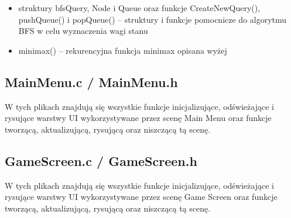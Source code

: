 \documentclass[11pt]{article}
\begin{document}
		\begin{itemize}
			\item struktury bfsQuery, Node i Queue oraz funkcje CreateNewQuery(), pushQueue() i popQueue() -- struktury i funkcje pomocnicze do algorytmu BFS w celu wyznaczenia wagi stanu
			\item minimax() -- rekurencyjna funkcja minimax opisana wyżej
		\end{itemize}

		\subsection{MainMenu.c / MainMenu.h}
		\noindent W tych plikach znajdują się wszystkie funkcje inicjalizujące, odświeżające i rysujące warstwy UI wykorzystywane przez scenę Main Menu oraz funkcje tworzącą, aktualizującą, rysującą oraz niszczącą tą scenę.

		\subsection{GameScreen.c / GameScreen.h}
		\noindent W tych plikach znajdują się wszystkie funkcje inicjalizujące, odświeżające i rysujące warstwy UI wykorzystywane przez scenę Game Screen oraz funkcje tworzącą, aktualizującą, rysującą oraz niszczącą tą scenę.
\end{document}
